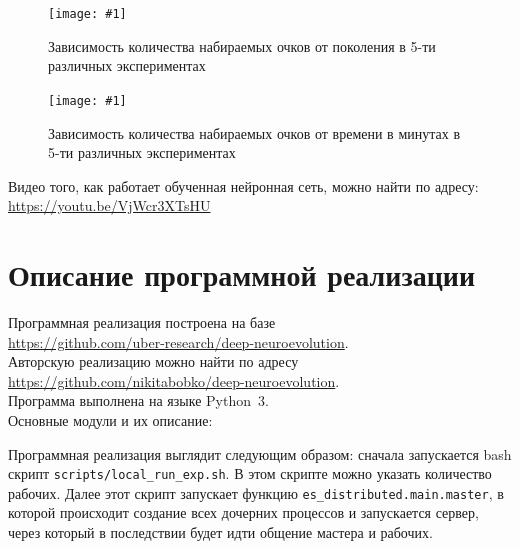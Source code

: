 \documentclass[12pt]{article}
\newcommand{\img}[3]{
    \begin{figure}[H]
        \centering
        \texttt{[image: \#1]}
        \caption{#3}
    \end{figure}
}
\begin{document}
    \img{score_plot.png}{1.0}{Зависимость количества набираемых очков от поколения в 5-ти различных экспериментах}

    \img{score_plot_per_time.png}{1.0}{Зависимость количества набираемых очков от времени в минутах в 5-ти различных экспериментах}

    Видео того, как работает обученная нейронная сеть, можно найти по адресу: \\
    \url{https://youtu.be/VjWcr3XTsHU}

\section{Описание программной реализации}
    Программная реализация построена на базе \\
    \url{https://github.com/uber-research/deep-neuroevolution}. \\
    Авторскую реализацию можно найти по адресу \\
    \url{https://github.com/nikitabobko/deep-neuroevolution}. \\
    Программа выполнена на языке Python~3.\\

    Основные модули и их описание:

    Программная реализация выглядит следующим образом: сначала запускается bash скрипт \verb!scripts/local_run_exp.sh!. В этом скрипте можно указать количество рабочих. Далее этот скрипт запускает функцию \verb!es_distributed.main.master!, в которой происходит создание всех дочерних процессов и запускается сервер, через который в последствии будет идти общение мастера и рабочих. \\
\end{document}
